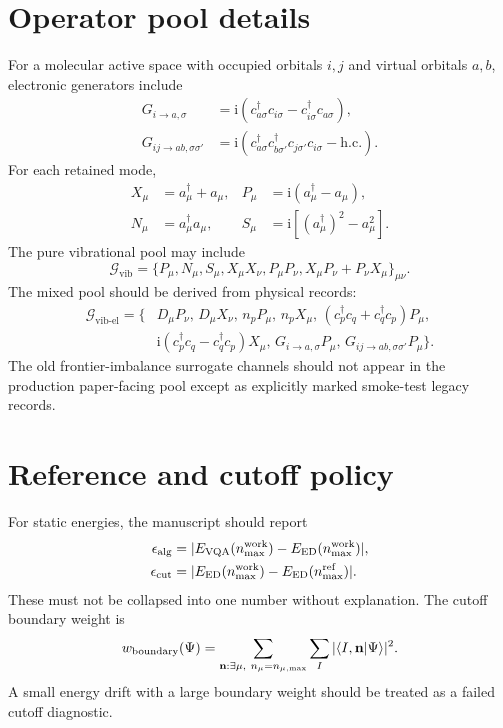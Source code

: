 \documentclass[
  reprint,
  amsmath,
  amssymb,
  aps,
  pra,
  nofootinbib,
  superscriptaddress,
  floatfix
]{revtex4-2}
\newcommand{\ii}{\mathrm{i}}
\newcommand{\braket}[2]{\langle #1|#2\rangle}
\newcommand{\Gcal}{\mathcal{G}}
\newcommand{\ed}{\mathrm{ED}}
\newcommand{\vib}{\mathrm{vib}}
\newcommand{\vibel}{\mathrm{vib}\text{-}\mathrm{el}}
\newcommand{\work}{\mathrm{work}}
\newcommand{\refc}{\mathrm{ref}}
\begin{document}
\section{Operator pool details}
\label{app:operator_pool}

For a molecular active space with occupied orbitals \(i,j\) and virtual orbitals \(a,b\), electronic generators include
\begin{align}
G_{i\to a,\sigma}
&=
\ii(c_{a\sigma}^\dagger c_{i\sigma}-c_{i\sigma}^\dagger c_{a\sigma}),
\nonumber\\
G_{ij\to ab,\sigma\sigma'}
&=
\ii(c_{a\sigma}^\dagger c_{b\sigma'}^\dagger c_{j\sigma'}c_{i\sigma}-\mathrm{h.c.}).
\label{eq:appendix_ucc_generators}
\end{align}
For each retained mode,
\begin{align}
X_\mu&=a_\mu^\dagger+a_\mu,
&
P_\mu&=\ii(a_\mu^\dagger-a_\mu),
\nonumber\\
N_\mu&=a_\mu^\dagger a_\mu,
&
S_\mu&=\ii[(a_\mu^\dagger)^2-a_\mu^2].
\label{eq:vib_generators}
\end{align}
The pure vibrational pool may include
\begin{equation}
\Gcal_{\vib}
=
\{P_\mu,N_\mu,S_\mu,X_\mu X_\nu,P_\mu P_\nu,X_\mu P_\nu+P_\nu X_\mu\}_{\mu\nu}.
\label{eq:vib_pool}
\end{equation}
The mixed pool should be derived from physical records:
\begin{align}
\Gcal_{\vibel}
=
\{&
D_\mu P_\nu,\,
D_\mu X_\nu,\,
n_pP_\mu,\,
n_pX_\mu,\,
(c_p^\dagger c_q+c_q^\dagger c_p)P_\mu,
\nonumber\\
&
\ii(c_p^\dagger c_q-c_q^\dagger c_p)X_\mu,\,
G_{i\to a,\sigma}P_\mu,\,
G_{ij\to ab,\sigma\sigma'}P_\mu
\}.
\label{eq:vibronic_pool}
\end{align}
The old frontier-imbalance surrogate channels should not appear in the production paper-facing pool except as explicitly marked smoke-test legacy records.

\section{Reference and cutoff policy}
\label{app:reference_policy}

For static energies, the manuscript should report
\begin{align}
\epsilon_{\rm alg}
&=
|E_{\rm VQA}(n_{\max}^{\work})-E_{\ed}(n_{\max}^{\work})|,
\nonumber\\
\epsilon_{\rm cut}
&=
|E_{\ed}(n_{\max}^{\work})-E_{\ed}(n_{\max}^{\refc})|.
\label{eq:appendix_error_split}
\end{align}
These must not be collapsed into one number without explanation.  The cutoff boundary weight is
\begin{equation}
w_{\rm boundary}(\Psi)
=
\sum_{\mathbf n:\exists\mu,\ n_\mu=n_{\mu,\max}}
\sum_I
|\braket{I,\mathbf n}{\Psi}|^2.
\label{eq:appendix_boundary}
\end{equation}
A small energy drift with a large boundary weight should be treated as a failed cutoff diagnostic.
\end{document}
